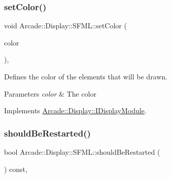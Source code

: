 \mbox{\label{classArcade_1_1Display_1_1SFML_aee515eb3ff41dc4f23a0115d2bc4f4a7}} 
\subsubsection{\texorpdfstring{setColor()}{setColor()}}
{\footnotesize\ttfamily void Arcade\+::\+Display\+::\+S\+F\+M\+L\+::set\+Color (\begin{DoxyParamCaption}\item[{\mbox{\hyperlink{classArcade_1_1Display_1_1IDisplayModule_ae0a776be9163d096051c522e21c007b2}{I\+Display\+Module\+::\+Colors}}}]{color }\end{DoxyParamCaption})\hspace{0.3cm}{\ttfamily [final]}, {\ttfamily [virtual]}}



Defines the color of the elements that will be drawn. 


\begin{DoxyParams}{Parameters}
{\em color} & The color \\
\hline
\end{DoxyParams}


Implements \mbox{\hyperlink{classArcade_1_1Display_1_1IDisplayModule_a9f81148f93a249d6fc91307819911b4e}{Arcade\+::\+Display\+::\+I\+Display\+Module}}.

\mbox{\label{classArcade_1_1Display_1_1SFML_a7c276ccbf48700092eb637d73b78e0d1}} 
\subsubsection{\texorpdfstring{shouldBeRestarted()}{shouldBeRestarted()}}
{\footnotesize\ttfamily bool Arcade\+::\+Display\+::\+S\+F\+M\+L\+::should\+Be\+Restarted (\begin{DoxyParamCaption}{ }\end{DoxyParamCaption}) const\hspace{0.3cm}{\ttfamily [final]}, {\ttfamily [virtual]}}



